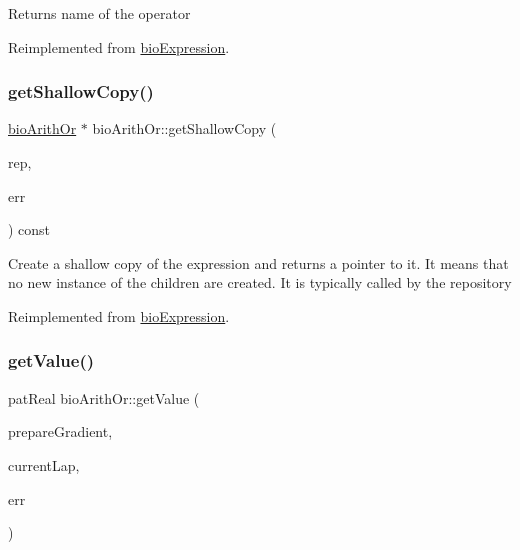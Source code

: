 \begin{DoxyReturn}{Returns}
name of the operator 
\end{DoxyReturn}


Reimplemented from \hyperlink{classbio_expression_a2353a4afb3a2b0af7c63aba086a72bde}{bio\+Expression}.

\mbox{\label{classbio_arith_or_a64c0b100e6bc8d877bd25dbf5224ff0b}} 
\subsubsection{\texorpdfstring{get\+Shallow\+Copy()}{getShallowCopy()}}
{\footnotesize\ttfamily \hyperlink{classbio_arith_or}{bio\+Arith\+Or} $\ast$ bio\+Arith\+Or\+::get\+Shallow\+Copy (\begin{DoxyParamCaption}\item[{\hyperlink{classbio_expression_repository}{bio\+Expression\+Repository} $\ast$}]{rep,  }\item[{pat\+Error $\ast$\&}]{err }\end{DoxyParamCaption}) const\hspace{0.3cm}{\ttfamily [virtual]}}

Create a shallow copy of the expression and returns a pointer to it. It means that no new instance of the children are created. It is typically called by the repository 

Reimplemented from \hyperlink{classbio_expression_a442534762693b92baaf33928979a1bf8}{bio\+Expression}.

\mbox{\label{classbio_arith_or_a59ec27e29f35c91f0a5fd2a8993a363b}} 
\subsubsection{\texorpdfstring{get\+Value()}{getValue()}}
{\footnotesize\ttfamily pat\+Real bio\+Arith\+Or\+::get\+Value (\begin{DoxyParamCaption}\item[{pat\+Boolean}]{prepare\+Gradient,  }\item[{pat\+U\+Long}]{current\+Lap,  }\item[{pat\+Error $\ast$\&}]{err }\end{DoxyParamCaption})\hspace{0.3cm}{\ttfamily [virtual]}}

